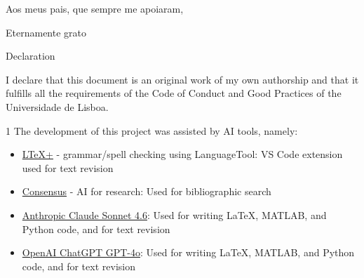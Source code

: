 \documentclass[  10pt, twoside]{report} %
\numberwithin{equation}{chapter}
\begin{document}
\newpage
\mbox{}
\newpage
\normalsize



\begin{flushright}

\vspace*{\fill} %

Aos meus pais, que sempre me apoiaram,


Eternamente grato
\vspace*{\fill}
\end{flushright}
\clearpage

\newpage
\mbox{}
\newpage
\null\vskip5cm%
\begin{flushleft}
Declaration

I declare that this document is an original work of my own authorship and that it fulfills all the requirements of the Code of Conduct and Good Practices of the Universidade de Lisboa.

\vspace{10mm}

\begin{spacing}{1}
The development of this project was assisted by AI tools, namely:
\begin{itemize}
    \item \href{https://marketplace.visualstudio.com/items?itemName=ltex-plus.vscode-ltex-plus}{LTeX+} - grammar/spell checking using LanguageTool: VS Code extension used for text revision
    \item \href{https://consensus.app/}{Consensus} - AI for research: Used for bibliographic search
    \item \href{https://claude.ai/}{Anthropic Claude Sonnet 4.6}: Used for writing LaTeX, MATLAB, and Python code, and for text revision
    \item \href{https://chatgpt.com/}{OpenAI ChatGPT GPT-4o}: Used for writing LaTeX, MATLAB, and Python code, and for text revision
\end{itemize}
\end{spacing}
\end{flushleft}
\vfill\newpage

\newpage
\mbox{}
\newpage
\end{document}
